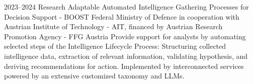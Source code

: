 \cventry
{2023--2024}
{Research}
{Adaptable Automated Intelligence Gathering Processes for Decision Support - BOOST}
{
  Federal Ministry of Defence
  in cooperation with Austrian Institute of Technology - AIT,
  financed by Austrian Research Promotion Agency - FFG
}
{Austria}
{
  Provide support for analysts by automating selected steps of the Intelligence Lifecycle Process:
  Structuring collected intelligence data, extraction of relevant information, validating hypothesis,
  and deriving recommendations for action.
  Implemented by interconnected services powered by an extensive customized taxonomy and LLMs.
}
